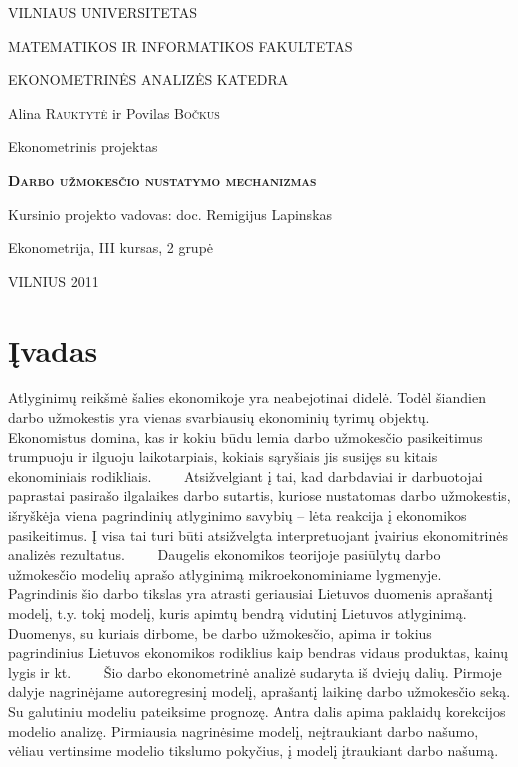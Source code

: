 \documentclass[12pt,a4paper]{article}
\theoremstyle{change}\newtheorem{salyga}{Uždavinys}
\begin{document}
\begin{titlepage}
\centerline{ \large VILNIAUS UNIVERSITETAS}
\bigskip
\centerline{\large MATEMATIKOS IR INFORMATIKOS FAKULTETAS}
\smallskip

\centerline{\large  EKONOMETRINĖS ANALIZĖS KATEDRA}
\vskip 200pt
\centerline{ \large Alina \textsc{Rauktytė} ir Povilas \textsc{Bočkus}}
\vskip 50pt
\centerline{\Large Ekonometrinis projektas}
\vskip 25pt
\centerline{\bf \Large \textsc{Darbo užmokesčio nustatymo mechanizmas}}
\vskip 25pt
\bigskip
\vskip 50pt
\begin{flushright}
 Kursinio projekto vadovas: 
 doc. Remigijus Lapinskas
\end{flushright}
\hfill Ekonometrija, III kursas, 2 grupė
\vskip 150pt
\centerline{\large VILNIUS 2011}
\end{titlepage}

\tableofcontents
\pagebreak







\section{Įvadas}
\bigskip
\hspace{40pt}Atlyginimų reikšmė šalies ekonomikoje yra neabejotinai didelė. Todėl šiandien darbo užmokestis yra vienas svarbiausių ekonominių tyrimų objektų. Ekonomistus domina, kas ir kokiu būdu lemia darbo užmokesčio pasikeitimus trumpuoju ir ilguoju laikotarpiais, kokiais sąryšiais jis susijęs su kitais ekonominiais rodikliais.
\vskip 8pt
$\qquad $Atsižvelgiant į tai, kad darbdaviai ir darbuotojai paprastai pasirašo ilgalaikes darbo sutartis,  kuriose nustatomas darbo užmokestis, išryškėja viena pagrindinių atlyginimo savybių – lėta reakcija į ekonomikos pasikeitimus. Į visa tai turi būti atsižvelgta interpretuojant įvairius ekonomitrinės analizės rezultatus.
\vskip 8pt
$\qquad $Daugelis ekonomikos teorijoje pasiūlytų darbo užmokesčio modelių aprašo atlyginimą mikroekonominiame lygmenyje. Pagrindinis šio darbo tikslas yra atrasti geriausiai Lietuvos duomenis aprašantį modelį, t.y. tokį modelį, kuris apimtų bendrą vidutinį Lietuvos atlyginimą. Duomenys, su kuriais dirbome, be darbo užmokesčio, apima ir tokius pagrindinius Lietuvos ekonomikos rodiklius kaip bendras vidaus produktas, kainų lygis ir kt.
\vskip 8pt
$\qquad $Šio darbo ekonometrinė analizė sudaryta iš dviejų dalių.  Pirmoje dalyje nagrinėjame autoregresinį modelį, aprašantį laikinę darbo užmokesčio seką. Su galutiniu modeliu pateiksime prognozę. Antra dalis apima paklaidų korekcijos modelio analizę. Pirmiausia nagrinėsime modelį, neįtraukiant darbo našumo, vėliau vertinsime modelio tikslumo pokyčius, į modelį įtraukiant darbo našumą.
\vskip 8pt
\pagebreak
\end{document}
